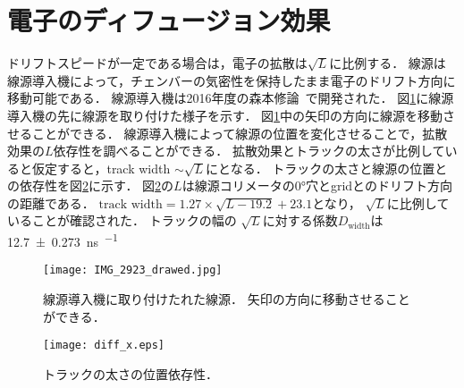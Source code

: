\documentclass[../master]{subfiles}
\begin{document}
\section{電子のディフュージョン効果}
ドリフトスピードが一定である場合は，電子の拡散は$\sqrt{L}$に比例する．
線源は線源導入機によって，チェンバーの気密性を保持したまま電子のドリフト方向に移動可能である．
線源導入機は2016年度の森本修論~\cite{morimoto_thesis}で開発された．
図\ref{pic::source_insirtion}に線源導入機の先に線源を取り付けた様子を示す．
図\ref{pic::source_insirtion}中の矢印の方向に線源を移動させることができる．
線源導入機によって線源の位置を変化させることで，拡散効果の$L$依存性を調べることができる．
拡散効果とトラックの太さが比例していると仮定すると，track width $\sim\sqrt{L}$にとなる．
トラックの太さと線源の位置との依存性を図\ref{fig::diff_x}に示す．
図\ref{fig::diff_x}の$L$は線源コリメータの\ang{0}穴とgridとのドリフト方向の距離である．
$\text{track width} = 1.27\times\sqrt{L-19.2}+23.1$となり，
$\sqrt{L}$に比例していることが確認された．
トラックの幅の $\sqrt{L}$に対する係数$D_{\text{width}}$は\SI{12.7\pm0.273}{\nano\second\per\sqrt{\milli\metre}}
\begin{figure}
  \centering
  \texttt{[image: IMG\_2923\_drawed.jpg]}
  \caption[線源導入機に取り付けたれた線源．]
          {線源導入機に取り付けたれた線源．
          矢印の方向に移動させることができる．}
  \label{pic::source_insirtion}
\end{figure}
\begin{figure}
  \centering
  \texttt{[image: diff\_x.eps]}
  \caption{トラックの太さの位置依存性．}
  \label{fig::diff_x}
\end{figure}
\end{document}
